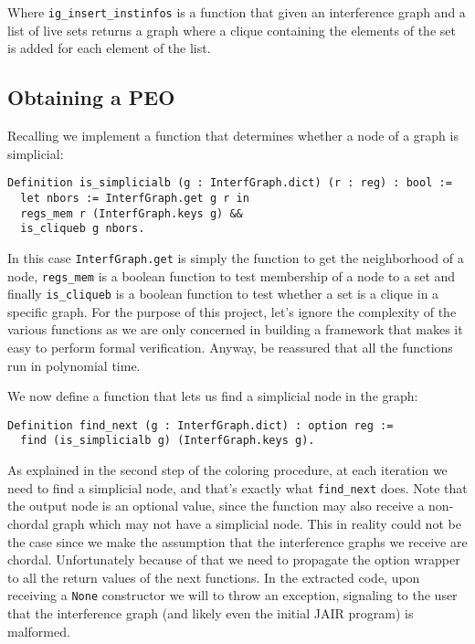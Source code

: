 Where \texttt{ig\_insert\_instinfos} is a function that given an interference graph and a list of live sets returns a graph where a clique containing the elements of the set is added for each element of the list.

\subsection{Obtaining a PEO}

Recalling  we implement a function that determines whether a node of a graph is simplicial:

\begin{lstlisting}[style=Coq]
Definition is_simplicialb (g : InterfGraph.dict) (r : reg) : bool :=
  let nbors := InterfGraph.get g r in
  regs_mem r (InterfGraph.keys g) &&
  is_cliqueb g nbors.
\end{lstlisting}

In this case \texttt{InterfGraph.get} is simply the function to get the neighborhood of a node, \texttt{regs\_mem} is a boolean function to test membership of a node to a set and finally \texttt{is\_cliqueb} is a boolean function to test whether a set is a clique in a specific graph.
For the purpose of this project, let's ignore the complexity of the various functions as we are only concerned in building a framework that makes it easy to perform formal verification. Anyway, be reassured that all the functions run in polynomial time.

We now define a function that lets us find a simplicial node in the graph:

\begin{lstlisting}[style=Coq]
Definition find_next (g : InterfGraph.dict) : option reg :=
  find (is_simplicialb g) (InterfGraph.keys g).
\end{lstlisting}

As explained in the second step of the coloring procedure, at each iteration we need to find a simplicial node, and that's exactly what \texttt{find\_next} does. Note that the output node is an optional value, since the function may also receive a non-chordal graph which may not have a simplicial node. This in reality could not be the case since we make the assumption that the interference graphs we receive are chordal. Unfortunately because of that we need to propagate the option wrapper to all the return values of the next functions.
In the extracted code, upon receiving a \texttt{None} constructor we will to throw an exception, signaling to the user that the interference graph (and likely even the initial JAIR program) is malformed.

